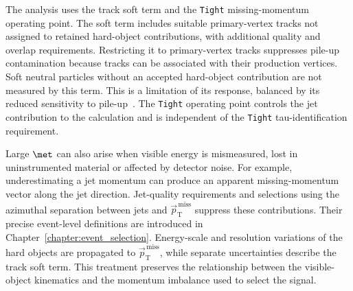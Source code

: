 The analysis uses the track soft term and the \texttt{Tight} missing-momentum operating point.
The soft term includes suitable primary-vertex tracks not assigned to retained hard-object contributions, with additional quality and overlap requirements.
Restricting it to primary-vertex tracks suppresses pile-up contamination because tracks can be associated with their production vertices.
Soft neutral particles without an accepted hard-object contribution are not measured by this term.
This is a limitation of its response, balanced by its reduced sensitivity to pile-up~\cite{ATLAS2025METPerformance}.
The \texttt{Tight} operating point controls the jet contribution to the calculation and is independent of the \texttt{Tight} tau-identification requirement.

Large $\met$ can also arise when visible energy is mismeasured, lost in uninstrumented material or affected by detector noise.
For example, underestimating a jet momentum can produce an apparent missing-momentum vector along the jet direction.
Jet-quality requirements and selections using the azimuthal separation between jets and $\vec p_{\mathrm{T}}^{\,\mathrm{miss}}$ suppress these contributions.
Their precise event-level definitions are introduced in Chapter~\ref{chapter:event_selection}.
Energy-scale and resolution variations of the hard objects are propagated to $\vec p_{\mathrm{T}}^{\,\mathrm{miss}}$, while separate uncertainties describe the track soft term.
This treatment preserves the relationship between the visible-object kinematics and the momentum imbalance used to select the signal.
